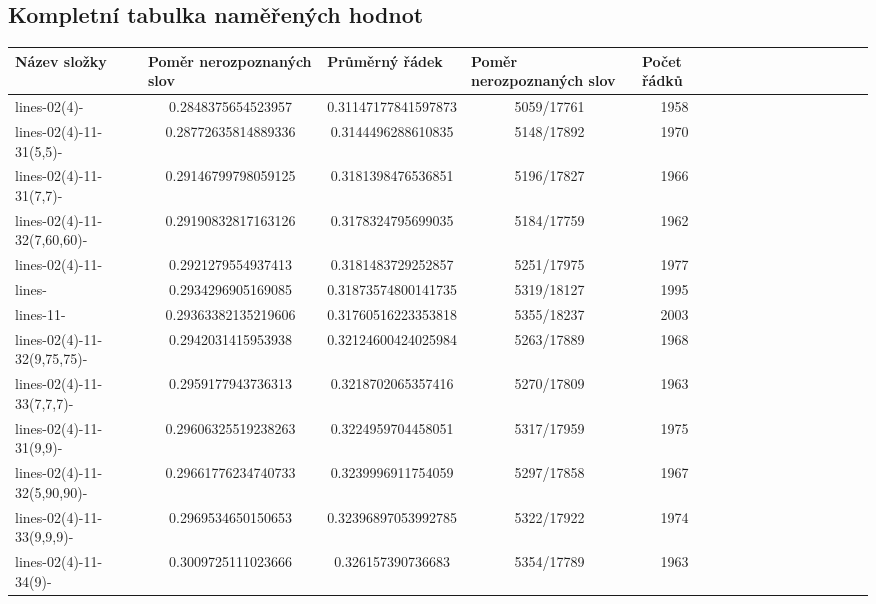 \documentclass[12pt,oneside]{report}			%
\begin{document}
\begin{landscape}
\section{Kompletní tabulka naměřených hodnot}

\begin{longtable}{ | p{5cm} | *{15}{c|}}
\hline
\multicolumn{1}{|l|}{Název složky}                & \multicolumn{1}{l|}{Poměr nerozpoznaných slov} & \multicolumn{1}{l|}{Průměrný řádek} & \multicolumn{1}{l|}{Poměr nerozpoznaných slov} & \multicolumn{1}{l|}{Počet řádků} \\ \hline
lines-02(4)-                                      & 0.2848375654523957  & 0.31147177841597873 & 5059/17761  & 1958 \\
lines-02(4)-11-31(5,5)-                           & 0.28772635814889336 & 0.3144496288610835  & 5148/17892  & 1970 \\
lines-02(4)-11-31(7,7)-                           & 0.29146799798059125 & 0.3181398476536851  & 5196/17827  & 1966 \\
lines-02(4)-11-32(7,60,60)-                       & 0.29190832817163126 & 0.3178324795699035  & 5184/17759  & 1962 \\
lines-02(4)-11-                                   & 0.2921279554937413  & 0.3181483729252857  & 5251/17975  & 1977 \\
lines-                                            & 0.2934296905169085  & 0.31873574800141735 & 5319/18127  & 1995 \\
lines-11- & 0.29363382135219606 & 0.31760516223353818 & 5355/18237 & 2003 \\
lines-02(4)-11-32(9,75,75)-                       & 0.2942031415953938  & 0.32124600424025984 & 5263/17889  & 1968 \\
lines-02(4)-11-33(7,7,7)-                        & 0.2959177943736313  & 0.3218702065357416  & 5270/17809  & 1963 \\
lines-02(4)-11-31(9,9)-                           & 0.29606325519238263 & 0.3224959704458051  & 5317/17959  & 1975 \\
lines-02(4)-11-32(5,90,90)-                       & 0.29661776234740733 & 0.3239996911754059  & 5297/17858  & 1967 \\
lines-02(4)-11-33(9,9,9)-                         & 0.2969534650150653  & 0.32396897053992785 & 5322/17922  & 1974 \\
lines-02(4)-11-34(9)-                             & 0.3009725111023666  & 0.326157390736683   & 5354/17789  & 1963 \\

\end{longtable}
\end{landscape}
\end{document}
